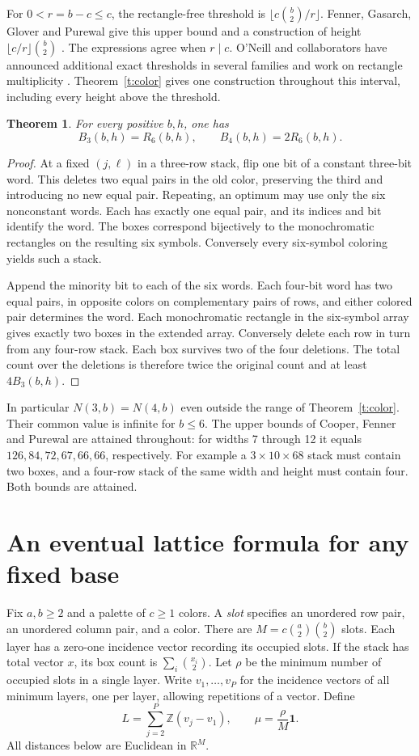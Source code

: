 \documentclass[11pt]{article}
\newtheorem{theorem}{Theorem}
\newcommand{\one}{\mathbf 1}
\newcommand{\Z}{\mathbb Z}
\begin{document}
For $0<r=b-c\le c$, the rectangle-free threshold is $\lfloor c\binom b2/r\rfloor$. Fenner, Gasarch, Glover and Purewal give this upper bound and a construction of height $\lfloor c/r\rfloor\binom b2$ \cite[Cor.~2.12 and Thm.~3.6]{fggp}. The expressions agree when $r\mid c$. O'Neill and collaborators have announced additional exact thresholds in several families and work on rectangle multiplicity \cite{oneill}. Theorem~\ref{t:color} gives one construction throughout this interval, including every height above the threshold.

\begin{theorem}\label{t:transfer}
For every positive $b,h$, one has
\[
 B_3(b,h)=R_6(b,h),\qquad B_4(b,h)=2R_6(b,h).
\]
\end{theorem}
\begin{proof}
At a fixed $(j,\ell)$ in a three-row stack, flip one bit of a constant three-bit word. This deletes two equal pairs in the old color, preserving the third and introducing no new equal pair. Repeating, an optimum may use only the six nonconstant words. Each has exactly one equal pair, and its indices and bit identify the word. The boxes correspond bijectively to the monochromatic rectangles on the resulting six symbols. Conversely every six-symbol coloring yields such a stack.

Append the minority bit to each of the six words. Each four-bit word has two equal pairs, in opposite colors on complementary pairs of rows, and either colored pair determines the word. Each monochromatic rectangle in the six-symbol array gives exactly two boxes in the extended array. Conversely delete each row in turn from any four-row stack. Each box survives two of the four deletions. The total count over the deletions is therefore twice the original count and at least $4B_3(b,h)$.
\end{proof}
In particular $N(3,b)=N(4,b)$ even outside the range of Theorem~\ref{t:color}. Their common value is infinite for $b\le6$. The upper bounds of Cooper, Fenner and Purewal \cite[Table~2]{cfp} are attained throughout: for widths 7 through 12 it equals $126,84,72,67,66,66$, respectively. For example a $3\times10\times68$ stack must contain two boxes, and a four-row stack of the same width and height must contain four. Both bounds are attained.

\section{An eventual lattice formula for any fixed base}
Fix $a,b\ge2$ and a palette of $c\ge1$ colors. A \emph{slot} specifies an unordered row pair, an unordered column pair, and a color. There are $M=c\binom a2\binom b2$ slots. Each layer has a zero-one incidence vector recording its occupied slots. If the stack has total vector $x$, its box count is $\sum_i\binom{x_i}{2}$. Let $\rho$ be the minimum number of occupied slots in a single layer. Write $v_1,\ldots,v_P$ for the incidence vectors of all minimum layers, one per layer, allowing repetitions of a vector. Define
\[
 L=\sum_{j=2}^P\Z(v_j-v_1),\qquad \mu=\frac{\rho}{M}\one .
\]
All distances below are Euclidean in $\mathbb R^M$.
\end{document}
